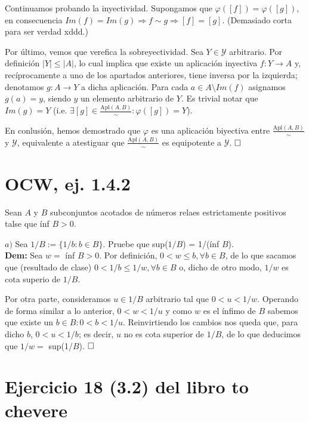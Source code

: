 \documentclass{article}
\begin{document}
Continuamos probando la inyectividad. Supongamos que $\varphi([f]) = \varphi([g])$, en consecuencia $Im(f) = Im(g) \Longrightarrow f \sim g \Longrightarrow [f] = [g]$. (Demasiado corta para ser verdad xddd.)

Por último, vemos que verefica la sobreyectividad. Sea $Y \in \mathcal{Y}$ arbitrario. Por definición $|Y| \leq |A|$, lo cual implica que existe un aplicación inyectiva $f : Y \longrightarrow A$ y, recíprocamente a uno de los apartados anteriores, tiene inversa por la izquierda; denotamos $g : A \longrightarrow Y$ a dicha aplicación. Para cada $a \in A \setminus Im(f)$ asignamos $g(a) = y$, siendo $y$ un elemento arbitrario de $Y$. Es trivial notar que $Im(g) = Y$ (i.e. $\exists [g] \in \frac{\text{Apl}(A, B)}{\sim} : \varphi([g]) = Y$).

En conlusión, hemos demostrado que $\varphi$ es una aplicación biyectiva entre $\frac{\text{Apl}(A, B)}{\sim}$ y $\mathcal{Y}$, equivalente a atestiguar que $\frac{\text{Apl}(A, B)}{\sim}$ es equipotente a $\mathcal{Y}$. $\hfill\square$

\newpage

\section{OCW, ej. 1.4.2}

Sean $A$ y $B$ subconjuntos acotados de números relaes estrictamente positivos talse que ínf $B > 0$.

$a)$ Sea $1/B := \{1/b : b \in B\}$. Pruebe que sup($1/B$) = 1/(ínf $B$). \\

\noindent \textbf{Dem:} Sea $w =$ ínf $B > 0$. Por definición, $0 < w \leq b, \forall b \in B$, de lo que sacamos que (resultado de clase) $0 < 1/b \leq 1/w, \forall b \in B$ o, dicho de otro modo, $1/w$ es cota superio de $1/B$.

Por otra parte, consideramos $u \in 1/B$ arbitrario tal que $0 < u < 1/w$. Operando de forma similar a lo anterior, $0 < w < 1/u$ y como $w$ es el ínfimo de $B$ sabemos que existe un $b \in B : 0 < b < 1/u$. Reinvirtiendo los cambios nos queda que, para dicho $b$, $0 < u < 1/b$; es decir, $u$ no es cota superior de $1/B$, de lo que deducimos que $1/w =$ sup(1/$B$). $\hfill\square$

\newpage

\section{Ejercicio 18 (3.2) del libro to chevere}
\end{document}
